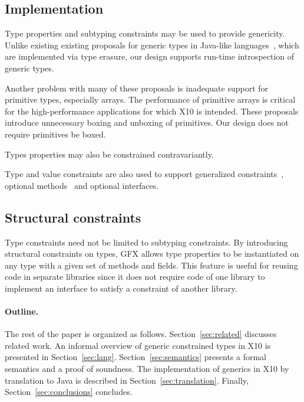 \documentclass[preprint,nocopyrightspace,9pt]{sigplanconf}
\newcommand\gxx{GFX\xspace}
\begin{document}

\subsection{Implementation}

Type properties and subtyping constraints may be used to 
provide genericity.  Unlike existing 
existing proposals for generic types in
Java-like
languages~\cite{Java3,adding-wildcards,GJ,Pizza,polyj,thorup97,allen03,allen04,csharp,emir06,scala},
which 
are implemented via type erasure,
our design supports run-time introspection of generic types.

Another problem with many of these proposals is inadequate support
for primitive types, especially arrays. The performance of primitive arrays is
critical for the high-performance applications for which
X10 is intended. These proposals introduce unnecessary boxing
and unboxing of primitives.
Our design does not require primitives be boxed.

Types properties may also be constrained contravariantly.

Type and value constraints are also used to support generalized
constraints~\cite{emir06}, optional methods~\cite{clu} and
optional interfaces.

\subsection{Structural constraints}

Type constraints need not be limited to subtyping constraints.
By introducing structural constraints on types, \gxx allows
type properties to be instantiated on any type with a given set
of methods and fields. This feature is useful for reusing code
in separate libraries since it does not require 
code of one library to implement an interface to satisfy a
constraint of another library.


\paragraph{Outline.}
The rest of the paper is organized as follows.
%
Section~\ref{sec:related} discusses related work.
%
An informal overview of generic constrained types in X10
is presented in
Section~\ref{sec:lang}.  
%
Section~\ref{sec:semantics} presents a formal semantics and a
proof of soundness.
%
The implementation of generics in X10 by translation to Java is described in 
Section~\ref{sec:translation}.
%
Finally, Section~\ref{sec:conclusions} concludes.
\end{document}
